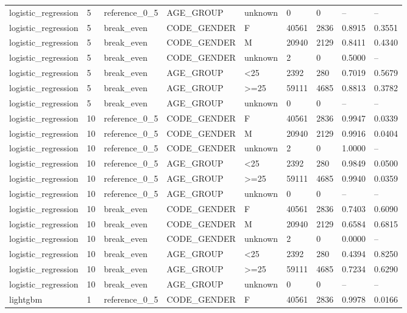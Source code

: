 \begin{longtable}{lllllllll}
logistic\_regression & 5 & reference\_0\_5 & AGE\_GROUP & unknown & 0 & 0 & -- & -- \\
logistic\_regression & 5 & break\_even & CODE\_GENDER & F & 40561 & 2836 & 0.8915 & 0.3551 \\
logistic\_regression & 5 & break\_even & CODE\_GENDER & M & 20940 & 2129 & 0.8411 & 0.4340 \\
logistic\_regression & 5 & break\_even & CODE\_GENDER & unknown & 2 & 0 & 0.5000 & -- \\
logistic\_regression & 5 & break\_even & AGE\_GROUP & <25 & 2392 & 280 & 0.7019 & 0.5679 \\
logistic\_regression & 5 & break\_even & AGE\_GROUP & >=25 & 59111 & 4685 & 0.8813 & 0.3782 \\
logistic\_regression & 5 & break\_even & AGE\_GROUP & unknown & 0 & 0 & -- & -- \\
logistic\_regression & 10 & reference\_0\_5 & CODE\_GENDER & F & 40561 & 2836 & 0.9947 & 0.0339 \\
logistic\_regression & 10 & reference\_0\_5 & CODE\_GENDER & M & 20940 & 2129 & 0.9916 & 0.0404 \\
logistic\_regression & 10 & reference\_0\_5 & CODE\_GENDER & unknown & 2 & 0 & 1.0000 & -- \\
logistic\_regression & 10 & reference\_0\_5 & AGE\_GROUP & <25 & 2392 & 280 & 0.9849 & 0.0500 \\
logistic\_regression & 10 & reference\_0\_5 & AGE\_GROUP & >=25 & 59111 & 4685 & 0.9940 & 0.0359 \\
logistic\_regression & 10 & reference\_0\_5 & AGE\_GROUP & unknown & 0 & 0 & -- & -- \\
logistic\_regression & 10 & break\_even & CODE\_GENDER & F & 40561 & 2836 & 0.7403 & 0.6090 \\
logistic\_regression & 10 & break\_even & CODE\_GENDER & M & 20940 & 2129 & 0.6584 & 0.6815 \\
logistic\_regression & 10 & break\_even & CODE\_GENDER & unknown & 2 & 0 & 0.0000 & -- \\
logistic\_regression & 10 & break\_even & AGE\_GROUP & <25 & 2392 & 280 & 0.4394 & 0.8250 \\
logistic\_regression & 10 & break\_even & AGE\_GROUP & >=25 & 59111 & 4685 & 0.7234 & 0.6290 \\
logistic\_regression & 10 & break\_even & AGE\_GROUP & unknown & 0 & 0 & -- & -- \\
lightgbm & 1 & reference\_0\_5 & CODE\_GENDER & F & 40561 & 2836 & 0.9978 & 0.0166 \\

\end{longtable}
